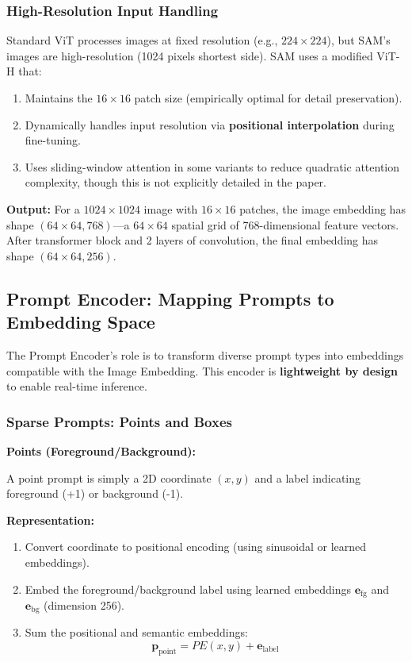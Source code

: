 \subsubsection{High-Resolution Input Handling}

Standard ViT processes images at fixed resolution (e.g., $224 \times 224$), but SAM's images are high-resolution (1024 pixels shortest side). SAM uses a modified ViT-H that:

\begin{enumerate}
    \item Maintains the $16 \times 16$ patch size (empirically optimal for detail preservation).
    \item Dynamically handles input resolution via \textbf{positional interpolation} during fine-tuning.
    \item Uses sliding-window attention in some variants to reduce quadratic attention complexity, though this is not explicitly detailed in the paper.
\end{enumerate}

\textbf{Output:} For a $1024 \times 1024$ image with $16 \times 16$ patches, the image embedding has shape $(64 \times 64, 768)$—a $64 \times 64$ spatial grid of 768-dimensional feature vectors. After transformer block and 2 layers of convolution, the final embedding has shape $(64 \times 64, 256)$.

\subsection{Prompt Encoder: Mapping Prompts to Embedding Space}

The Prompt Encoder's role is to transform diverse prompt types into embeddings compatible with the Image Embedding. This encoder is \textbf{lightweight by design} to enable real-time inference.

\subsubsection{Sparse Prompts: Points and Boxes}

\textbf{Points (Foreground/Background):}

A point prompt is simply a 2D coordinate $(x, y)$ and a label indicating foreground (+1) or background (-1).

\textbf{Representation:}
\begin{enumerate}
    \item Convert coordinate to positional encoding (using sinusoidal or learned embeddings).
    \item Embed the foreground/background label using learned embeddings $\mathbf{e}_{\text{fg}}$ and $\mathbf{e}_{\text{bg}}$ (dimension 256).
    \item Sum the positional and semantic embeddings:
       \[ \mathbf{p}_{\text{point}} = PE(x, y) + \mathbf{e}_{\text{label}} \]
\end{enumerate}

